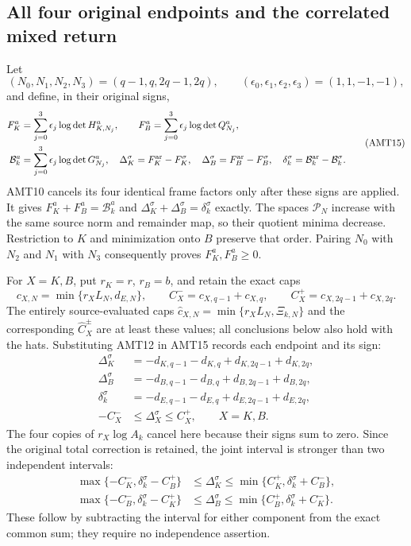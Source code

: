 \documentclass[11pt,a4paper]{article}
\begin{document}
\subsection{All four original endpoints and the correlated mixed return}
Let
\[
 (N_0,N_1,N_2,N_3)=(q-1,q,2q-1,2q),\qquad
 (\epsilon_0,\epsilon_1,\epsilon_2,\epsilon_3)=(1,1,-1,-1),
\]
and define, in their original signs,
\[
\begin{aligned}
 F_K^a&=\sum_{j=0}^3\epsilon_j\log\det H_{K,N_j}^a,\qquad
 F_B^a=\sum_{j=0}^3\epsilon_j\log\det Q_{N_j}^a,\\
 \mathcal B_k^a&=\sum_{j=0}^3\epsilon_j\log\det G_{N_j}^a,
 \quad\Delta_K^\sigma=F_K^{\rm ar}-F_K^\sigma,
 \quad\Delta_B^\sigma=F_B^{\rm ar}-F_B^\sigma,
 \quad\delta_k^\sigma=\mathcal B_k^{\rm ar}-\mathcal B_k^\sigma.
\end{aligned}\tag{AMT15}
\]
AMT10 cancels its four identical frame factors only after these
signs are applied. It gives
$F_K^a+F_B^a=\mathcal B_k^a$ and
$\Delta_K^\sigma+\Delta_B^\sigma=\delta_k^\sigma$ exactly.
The spaces $\mathcal P_N$ increase with the same source norm and
remainder map, so their quotient minima decrease. Restriction to
$K$ and minimization onto $B$ preserve that order. Pairing $N_0$
with $N_2$ and $N_1$ with $N_3$ consequently proves
$F_K^a,F_B^a\ge0$.

For $X=K,B$, put $r_K=r$, $r_B=b$, and retain the exact caps
\[
 c_{X,N}=\min\{r_XL_N,d_{E,N}\},\qquad
 C_X^-=c_{X,q-1}+c_{X,q},\qquad
 C_X^+=c_{X,2q-1}+c_{X,2q}.
 \tag{AMT16}
\]
The entirely source-evaluated caps
$\widehat c_{X,N}=\min\{r_XL_N,\Xi_{k,N}\}$ and the corresponding
$\widehat C_X^\pm$ are at least these values; all conclusions below
also hold with the hats. Substituting AMT12 in AMT15 records each
endpoint and its sign:
\[
\boxed{\begin{aligned}
 \Delta_K^\sigma&=-d_{K,q-1}-d_{K,q}+d_{K,2q-1}+d_{K,2q},\\
 \Delta_B^\sigma&=-d_{B,q-1}-d_{B,q}+d_{B,2q-1}+d_{B,2q},\\
 \delta_k^\sigma&=-d_{E,q-1}-d_{E,q}+d_{E,2q-1}+d_{E,2q},\\
 -C_X^-&\le\Delta_X^\sigma\le C_X^+,\qquad X=K,B.
\end{aligned}}\tag{AMT17}
\]
The four copies of $r_X\log A_k$ cancel here because their signs
sum to zero. Since the original total correction is retained, the
joint interval is stronger than two independent intervals:
\[
\boxed{\begin{aligned}
 \max\{-C_K^-,\delta_k^\sigma-C_B^+\}
   &\le\Delta_K^\sigma\le
          \min\{C_K^+,\delta_k^\sigma+C_B^-\},\\
 \max\{-C_B^-,\delta_k^\sigma-C_K^+\}
   &\le\Delta_B^\sigma\le
          \min\{C_B^+,\delta_k^\sigma+C_K^-\}.
\end{aligned}}\tag{AMT18}
\]
These follow by subtracting the interval for either component from
the exact common sum; they require no independence assertion.
\end{document}
